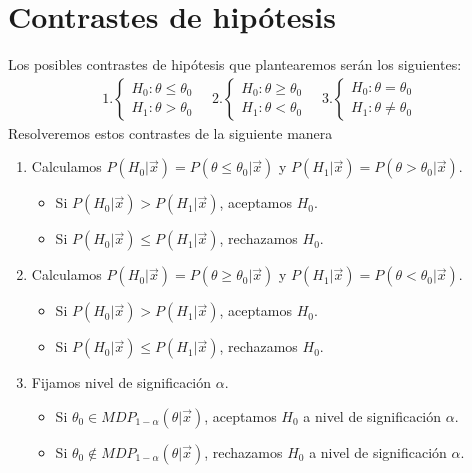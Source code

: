 \section{Contrastes de hipótesis}
Los posibles contrastes de hipótesis que plantearemos serán los siguientes:
\begin{align*}
    1. \begin{cases}
           H_0 : \theta \leq \theta_0 \\
           H_1 : \theta > \theta_0
       \end{cases} \quad     2.\begin{cases}
                                   H_0 : \theta \ge \theta_0 \\
                                   H_1 : \theta < \theta_0
                               \end{cases} \quad     3.\begin{cases}
                                                           H_0 : \theta = \theta_0 \\
                                                           H_1 : \theta \not = \theta_0
                                                       \end{cases}
\end{align*}
Resolveremos estos contrastes de la siguiente manera
\begin{enumerate}
    \item Calculamos $P(H_0 | \vec{x}) = P(\theta \leq \theta_0 |\vec{x})$ y $P(H_1 | \vec{x}) = P(\theta > \theta_0 | \vec{x})$.
          \begin{itemize}
              \item Si $P(H_0 | \vec{x}) > P(H_1 | \vec{x})$, aceptamos $H_0$.
              \item Si $P(H_0 | \vec{x}) \leq P(H_1 | \vec{x})$, rechazamos $H_0$.
          \end{itemize}
    \item Calculamos $P(H_0 | \vec{x}) = P(\theta \ge \theta_0 |\vec{x})$ y $P(H_1 | \vec{x}) = P(\theta < \theta_0 | \vec{x})$.
          \begin{itemize}
              \item Si $P(H_0 | \vec{x}) > P(H_1 | \vec{x})$, aceptamos $H_0$.
              \item Si $P(H_0 | \vec{x}) \leq P(H_1 | \vec{x})$, rechazamos $H_0$.
          \end{itemize}
    \item Fijamos nivel de significación $\alpha$.
          \begin{itemize}
              \item Si $\theta_0 \in MDP_{1 - \alpha}(\theta | \vec{x})$, aceptamos $H_0$ a nivel de significación $\alpha$.
              \item Si $\theta_0 \not\in MDP_{1 - \alpha}(\theta | \vec{x})$, rechazamos $H_0$ a nivel de significación $\alpha$.
          \end{itemize}
\end{enumerate}

